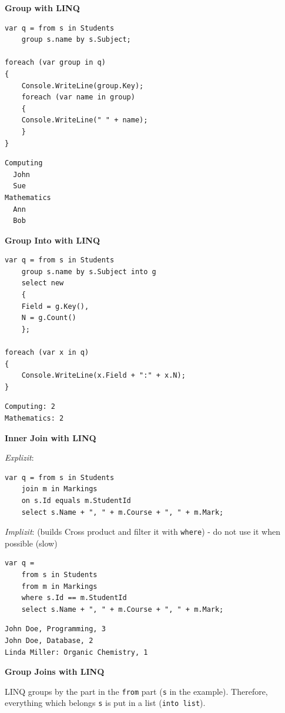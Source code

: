\documentclass[11pt,twoside,landscape]{article}
\begin{document}
\begin{multicols}{3}
\textbf{Group with LINQ}

\lstset{language=csharp,label= ,caption= ,captionpos=b,numbers=none}
\begin{lstlisting}
var q = from s in Students
    group s.name by s.Subject;

foreach (var group in q)
{
    Console.WriteLine(group.Key);
    foreach (var name in group)
    {
	Console.WriteLine(" " + name);
    }
}
\end{lstlisting}

\begin{verbatim}
Computing
  John
  Sue
Mathematics
  Ann
  Bob
\end{verbatim}

\textbf{Group Into with LINQ}

\lstset{language=csharp,label= ,caption= ,captionpos=b,numbers=none}
\begin{lstlisting}
var q = from s in Students
    group s.name by s.Subject into g
    select new
    {
	Field = g.Key(),
	N = g.Count()
    };

foreach (var x in q)
{
    Console.WriteLine(x.Field + ":" + x.N);
}
\end{lstlisting}
\begin{verbatim}
Computing: 2
Mathematics: 2
\end{verbatim}

\textbf{Inner Join with LINQ}

\emph{Explizit}:
\lstset{language=csharp,label= ,caption= ,captionpos=b,numbers=none}
\begin{lstlisting}
var q = from s in Students
    join m in Markings
    on s.Id equals m.StudentId
    select s.Name + ", " + m.Course + ", " + m.Mark;
\end{lstlisting}

\emph{Implizit}: (builds Cross product and filter it with \texttt{where}) - do not use it when possible (slow)
\lstset{language=csharp,label= ,caption= ,captionpos=b,numbers=none}
\begin{lstlisting}
var q =
    from s in Students
    from m in Markings
    where s.Id == m.StudentId
    select s.Name + ", " + m.Course + ", " + m.Mark;
\end{lstlisting}
\begin{verbatim}
John Doe, Programming, 3
John Doe, Database, 2
Linda Miller: Organic Chemistry, 1
\end{verbatim}

\textbf{Group Joins with LINQ}

LINQ groups by the part in the \texttt{from} part (\texttt{s} in the example).
Therefore, everything which belongs \texttt{s} is put in a list (\texttt{into list}).


\end{multicols}
\end{document}
